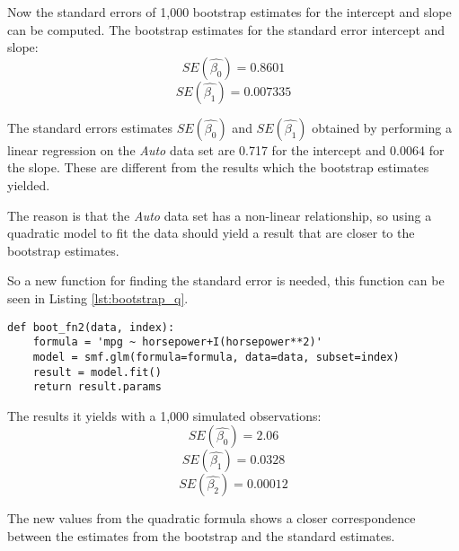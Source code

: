 Now the standard errors of 1,000 bootstrap estimates for the intercept and slope can be computed.
The bootstrap estimates for the standard error intercept and slope:
\begin{equation}
SE(\hat{\beta_0}) = 0.8601
\end{equation} 
\begin{equation}
SE(\hat{\beta_1}) = 0.007335
\end{equation}

The standard errors estimates $SE(\hat{\beta_0})$ and $SE(\hat{\beta_1})$ obtained by performing a linear regression on the \emph{Auto} data set are 0.717 for the intercept and 0.0064 for the slope. These are different from the results which the bootstrap estimates yielded.

The reason is that the \emph{Auto} data set has a non-linear relationship, so using a quadratic model to fit the data should yield a result that are closer to the bootstrap estimates.

So a new function for finding the standard error is needed, this function can be seen in Listing \ref{lst:bootstrap_q}.

\begin{lstlisting}[caption={Function to calculate standard error with a qudratic model}, label=lst:bootstrap_q, mathescape=true]
def boot_fn2(data, index):
	formula = 'mpg ~ horsepower+I(horsepower**2)'
	model = smf.glm(formula=formula, data=data, subset=index)
	result = model.fit()
	return result.params
\end{lstlisting}

The results it yields with a 1,000 simulated observations:
\begin{equation}
SE(\hat{\beta_0}) = 2.06
\end{equation}
\begin{equation}
SE(\hat{\beta_1}) = 0.0328
\end{equation}
\begin{equation}
SE(\hat{\beta_2}) = 0.00012
\end{equation}

The new values from the quadratic formula shows a closer correspondence between the estimates from the bootstrap and the standard estimates.